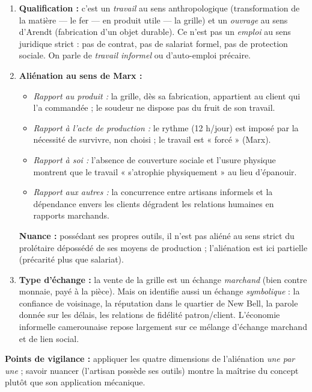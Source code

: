 \documentclass[11pt]{article}
\begin{document}
\begin{corrige}
\begin{enumerate}
    \item \textbf{Qualification :} c'est un \emph{travail} au sens anthropologique (transformation de la matière — le fer — en produit utile — la grille) et un \emph{ouvrage} au sens d'Arendt (fabrication d'un objet durable). Ce n'est pas un \emph{emploi} au sens juridique strict : pas de contrat, pas de salariat formel, pas de protection sociale. On parle de \emph{travail informel} ou d'auto-emploi précaire.
    \item \textbf{Aliénation au sens de Marx :}
    \begin{itemize}
        \item \emph{Rapport au produit :} la grille, dès sa fabrication, appartient au client qui l'a commandée ; le soudeur ne dispose pas du fruit de son travail.
        \item \emph{Rapport à l'acte de production :} le rythme (12 h/jour) est imposé par la nécessité de survivre, non choisi ; le travail est « forcé » (Marx).
        \item \emph{Rapport à soi :} l'absence de couverture sociale et l'usure physique montrent que le travail « s'atrophie physiquement » au lieu d'épanouir.
        \item \emph{Rapport aux autres :} la concurrence entre artisans informels et la dépendance envers les clients dégradent les relations humaines en rapports marchands.
    \end{itemize}
    \textbf{Nuance :} possédant ses propres outils, il n'est pas aliéné au sens strict du prolétaire dépossédé de ses moyens de production ; l'aliénation est ici partielle (précarité plus que salariat).
    \item \textbf{Type d'échange :} la vente de la grille est un échange \emph{marchand} (bien contre monnaie, payé à la pièce). Mais on identifie aussi un échange \emph{symbolique} : la confiance de voisinage, la réputation dans le quartier de New Bell, la parole donnée sur les délais, les relations de fidélité patron/client. L'économie informelle camerounaise repose largement sur ce mélange d'échange marchand et de lien social.
\end{enumerate}
\textbf{Points de vigilance :} appliquer les quatre dimensions de l'aliénation \emph{une par une} ; savoir nuancer (l'artisan possède ses outils) montre la maîtrise du concept plutôt que son application mécanique.
\end{corrige}
\end{document}
